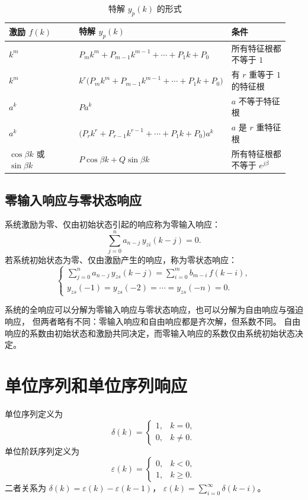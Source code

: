 \begin{table}[htbp]
\centering
\caption{特解 $y_p(k)$ 的形式}
\small
\begin{tabular}{@{}p{0.28\linewidth}p{0.42\linewidth}p{0.24\linewidth}@{}}
\toprule
激励 $f(k)$ & 特解 $y_p(k)$ & 条件 \\
\midrule
$k^{m}$ & $P_mk^{m}+P_{m-1}k^{m-1}+\cdots+P_1k+P_0$ & 所有特征根都不等于 $1$ \\
$k^{m}$ & $k^{r}\bigl(P_mk^{m}+P_{m-1}k^{m-1}+\cdots+P_1k+P_0\bigr)$ & 有 $r$ 重等于 $1$ 的特征根 \\
$a^{k}$ & $Pa^{k}$ & $a$ 不等于特征根 \\
$a^{k}$ & $\bigl(P_rk^{r}+P_{r-1}k^{r-1}+\cdots+P_1k+P_0\bigr)a^{k}$ & $a$ 是 $r$ 重特征根 \\
$\cos\beta k$ 或 $\sin\beta k$ & $P\cos\beta k+Q\sin\beta k$ & 所有特征根都不等于 $e^{j\beta}$ \\
\bottomrule
\end{tabular}
\end{table}

\subsection{零输入响应与零状态响应}

系统激励为零、仅由初始状态引起的响应称为零输入响应：
\[
    \sum_{j=0}^{n}a_{n-j}\,y_{zi}(k-j)=0 .
\]
若系统初始状态为零、仅由激励产生的响应，称为零状态响应：
\[
    \begin{cases}
        \displaystyle\sum_{j=0}^{n}a_{n-j}\,y_{zs}(k-j)=\sum_{i=0}^{m}b_{m-i}\,f(k-i),\\[8pt]
        y_{zs}(-1)=y_{zs}(-2)=\cdots=y_{zs}(-n)=0 .
    \end{cases}
\]

\begin{note}
系统的全响应可以分解为零输入响应与零状态响应，也可以分解为自由响应与强迫响应，
但两者略有不同：零输入响应和自由响应都是齐次解，但系数不同。
自由响应的系数由初始状态和激励共同决定，而零输入响应的系数仅由系统初始状态决定。
\end{note}

\section{单位序列和单位序列响应}

单位序列定义为
\[
    \delta(k)=
    \begin{cases}
        1, & k=0,\\
        0, & k\neq 0 .
    \end{cases}
\]
单位阶跃序列定义为
\[
    \varepsilon(k)=
    \begin{cases}
        0, & k<0,\\
        1, & k\ge 0 .
    \end{cases}
\]
二者关系为 $\delta(k)=\varepsilon(k)-\varepsilon(k-1)$，
$\varepsilon(k)=\sum_{i=0}^{\infty}\delta(k-i)$。


